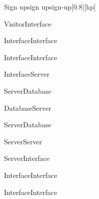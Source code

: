 \begin{sdfig}{Sign up}{sign up}{sign-up}[0.8][hp]
\begin{umlcall}[op={Sign up}]{Visitor}{Interface}
\begin{umlcall}[op={Validate}]{Interface}{Interface}
\begin{umlfragment}[type=alt, label=valid]
\begin{umlcall}[op={Set loading}]{Interface}{Interface}
\begin{umlcall}[op={Sign up}]{Interface}{Server}
\begin{umlcall}[op={Has user}]{Server}{Database}
\begin{umlfragment}[type=alt, label=true]
\begin{umlcall}[type=return,op={No}]{Database}{Server}
\begin{umlcall}[op={Create OTP}]{Server}{Database}
\begin{umlcall}[op={Send email}]{Server}{Server}
                      \begin{umlcall}[type=return,op={Ok}]{Server}{Interface}
                        \begin{umlcall}[op={Show success}]{Interface}{Interface}
                        \end{umlcall}
                      \end{umlcall}
                    \end{umlcall}
                  \end{umlcall}
                \end{umlcall}
              \end{umlfragment}
            \end{umlcall}
          \end{umlcall}
        \end{umlcall}
        \umlfpart[else]
        \begin{umlcall}[op={Show error}]{Interface}{Interface}
        \end{umlcall}
      \end{umlfragment}
    \end{umlcall}
  \end{umlcall}
\end{sdfig}

